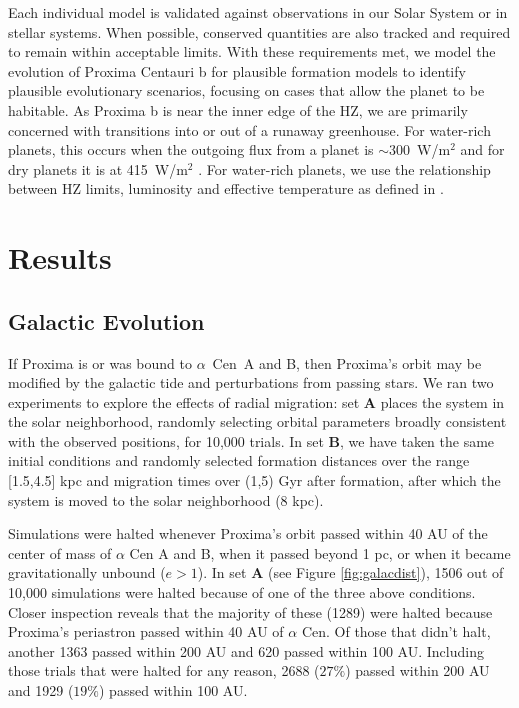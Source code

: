 \documentclass[preprint,12pt]{aastex}
\def\acen{{$\alpha$~Cen}}
\begin{document}
Each individual model is validated against observations in our Solar
System or in stellar systems. When possible, conserved quantities are
also tracked and required to remain within acceptable limits. With
these requirements met, we model the evolution of Proxima Centauri b
for plausible formation models to identify plausible evolutionary
scenarios, focusing on cases that allow the planet to be habitable. As
Proxima b is near the inner edge of the HZ, we are primarily concerned
with transitions into or out of a runaway greenhouse. For water-rich
planets, this occurs when the outgoing flux from a planet is $\sim
300$~W/m$^2$ \citep{Kasting93,Abe93} and for dry planets it is at
415~W/m$^2$ \citep{Abe11}. For water-rich planets, we use the
relationship between HZ limits, luminosity and effective temperature
as defined in \cite{Kopparapu13}.

\section{Results\label{sec:results}}

\subsection{Galactic Evolution}
\label{sec:results:galactic}

If Proxima is or was bound to \acen~A and B, then Proxima's orbit may
be modified by the galactic tide and perturbations from passing
stars. We ran two experiments to explore the effects of radial
migration: set \textbf{A} places the system in the solar neighborhood,
randomly selecting orbital parameters broadly consistent with the
observed positions, for 10,000 trials. In set \textbf{B}, we have
taken the same initial conditions and randomly selected formation
distances over the range [1.5,4.5] kpc \citep{Loebman16} and migration
times over (1,5) Gyr after formation, after which the system is moved
to the solar neighborhood (8 kpc).

Simulations were halted whenever Proxima's orbit passed within 40 AU
of the center of mass of $\alpha$ Cen A and B, when it passed beyond 1
pc, or when it became gravitationally unbound ($e > 1$). In set
\textbf{A} (see Figure \ref{fig:galacdist}), 1506
out of 10,000 simulations were halted because of one of the three
above conditions.  Closer inspection reveals that the majority of
these (1289) were halted because Proxima's periastron passed within 40
AU of $\alpha$ Cen. Of those that didn't halt, another 1363 passed
within 200 AU and 620 passed within 100 AU. Including those trials
that were halted for any reason, 2688 ($27\%$) passed within 200 AU
and 1929 ($19\%$) passed within 100 AU.
\end{document}
